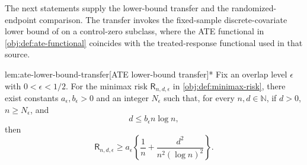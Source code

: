 \documentclass[11pt]{article}
\begin{document}
The next statements supply the lower-bound transfer and the randomized-endpoint comparison. The transfer invokes the fixed-sample discrete-covariate lower bound of \citet{ZengBalakrishnanHanKennedy2024} on a control-zero subclass, where the ATE functional in \cref{obj:def:ate-functional} coincides with the treated-response functional used in that source.

\begin{lemmav}{lem:ate-lower-bound-transfer}[ATE lower-bound transfer]*
Fix an overlap level \(\epsilon\) with \(0<\epsilon<1/2\). For the minimax risk \(\mathsf R_{n,d,\epsilon}\) in \cref{obj:def:minimax-risk}, there exist constants \(a_\epsilon,b_\epsilon>0\) and an integer \(N_\epsilon\) such that, for every \(n,d\in\mathbb N\), if \(d>0\), \(n\ge N_\epsilon\), and
\[
d\le b_\epsilon n\log n,
\]
then
\[
\mathsf R_{n,d,\epsilon}
\ge
a_\epsilon\left\{\frac1n+\frac{d^2}{n^2(\log n)^2}\right\}.
\]
\end{lemmav}
\end{document}
